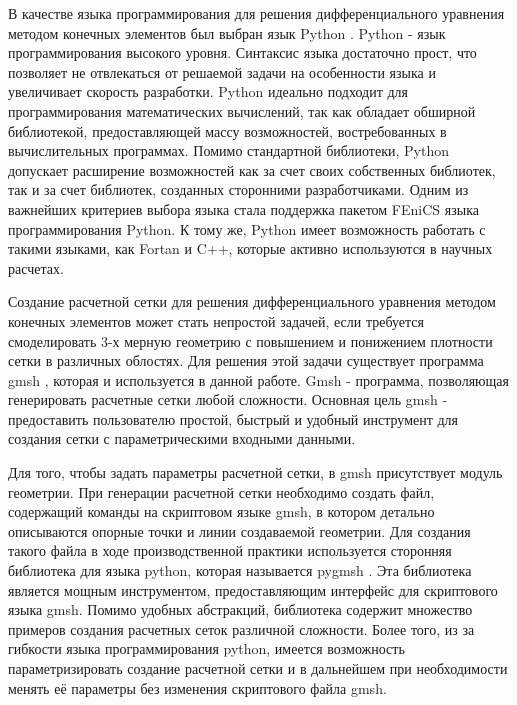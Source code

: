 В качестве языка программирования для решения дифференциального уравнения методом конечных элементов был выбран язык 
Python \cite{python_lutz}. Python - язык программирования высокого уровня. Синтаксис языка достаточно прост, что 
позволяет не отвлекаться от решаемой задачи на особенности языка и увеличивает скорость разработки. Python идеально 
подходит для программирования математических вычислений, так как обладает обширной библиотекой, предоставляющей массу 
возможностей, востребованных в вычислительных программах. Помимо стандартной библиотеки, Python допускает расширение 
возможностей как за счет своих собственных библиотек, так и за счет библиотек, созданных сторонними разработчиками. 
Одним из важнейших критериев выбора языка стала поддержка пакетом FEniCS языка программирования Python. К тому же, 
Python имеет возможность работать с такими языками, как Fortan и C++, которые активно используются в научных расчетах.

Создание расчетной сетки для решения дифференциального уравнения методом конечных элементов может стать непростой 
задачей, если требуется смоделировать 3-х мерную геометрию с повышением и понижением плотности сетки в различных 
облостях. Для решения этой задачи существует программа gmsh \cite{gmsh_man}, которая и используется в данной работе.
Gmsh - программа, позволяющая генерировать расчетные сетки любой сложности. Основная цель gmsh - предоставить 
пользователю простой, быстрый и удобный инструмент для создания сетки с параметрическими входными данными.

Для того, чтобы задать параметры расчетной сетки, в gmsh присутствует модуль геометрии. При генерации расчетной сетки 
необходимо создать файл, содержащий команды на скриптовом языке gmsh, в котором детально описываются опорные точки и 
линии создаваемой геометрии. Для создания такого файла в ходе производственной практики используется сторонняя 
библиотека для языка python, которая называется pygmsh \cite{pygmsh_doc}. Эта библиотека является мощным инструментом, 
предоставляющим интерфейс для скриптового языка gmsh. Помимо удобных абстракций, библиотека содержит множество 
примеров создания расчетных сеток различной сложности. Более того, из за гибкости языка программирования python, 
имеется возможность параметризировать создание расчетной сетки и в дальнейшем при необходимости менять её параметры 
без изменения скриптового файла gmsh.

